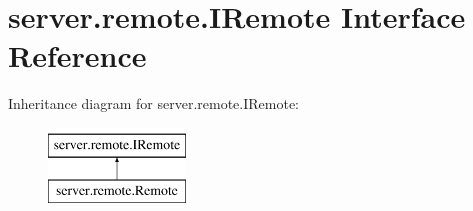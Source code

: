 \hypertarget{interfaceserver_1_1remote_1_1_i_remote}{}\section{server.\+remote.\+I\+Remote Interface Reference}
\label{interfaceserver_1_1remote_1_1_i_remote}
Inheritance diagram for server.\+remote.\+I\+Remote\+:\begin{figure}[H]
\begin{center}
\leavevmode
\includegraphics[height=2.000000cm]{interfaceserver_1_1remote_1_1_i_remote}
\end{center}
\end{figure}
